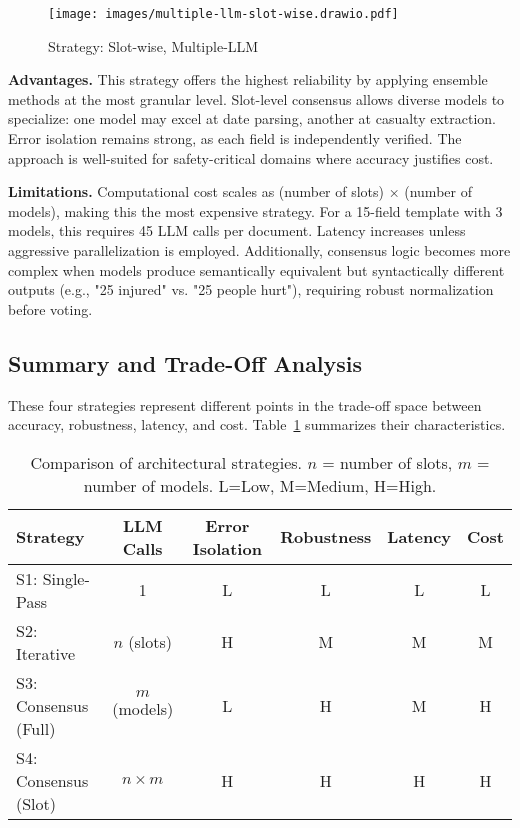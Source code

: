 \begin{figure}[H]
  \centering
  \texttt{[image: images/multiple-llm-slot-wise.drawio.pdf]}
  \caption{Strategy: Slot-wise, Multiple-LLM}
  \label{fig:multiple-llm-slot-wise}
\end{figure}

\textbf{Advantages.}  
This strategy offers the highest reliability by applying ensemble methods at the most granular level. Slot-level consensus allows diverse models to specialize: one model may excel at date parsing, another at casualty extraction. Error isolation remains strong, as each field is independently verified. The approach is well-suited for safety-critical domains where accuracy justifies cost.

\textbf{Limitations.}  
Computational cost scales as (number of slots) × (number of models), making this the most expensive strategy. For a 15-field template with 3 models, this requires 45 LLM calls per document. Latency increases unless aggressive parallelization is employed. Additionally, consensus logic becomes more complex when models produce semantically equivalent but syntactically different outputs (e.g., "25 injured" vs. "25 people hurt"), requiring robust normalization before voting.

\subsection{Summary and Trade-Off Analysis}
\label{subsec:strategy-summary}

These four strategies represent different points in the trade-off space between accuracy, robustness, latency, and cost. Table~\ref{tab:strategy-comparison} summarizes their characteristics.

\begin{table}[H]
\centering
\begin{tabular}{lccccc}
\toprule
\textbf{Strategy} & \textbf{LLM Calls} & \textbf{Error Isolation} & \textbf{Robustness} & \textbf{Latency} & \textbf{Cost} \\
\midrule
S1: Single-Pass & 1 & L & L & L & L \\
S2: Iterative & $n$ (slots) & H & M & M & M \\
S3: Consensus (Full) & $m$ (models) & L & H & M & H \\
S4: Consensus (Slot) & $n \times m$ & H & H & H & H \\
\bottomrule
\end{tabular}
\caption{Comparison of architectural strategies. $n$ = number of slots, $m$ = number of models. L=Low, M=Medium, H=High.}
\label{tab:strategy-comparison}
\end{table}

